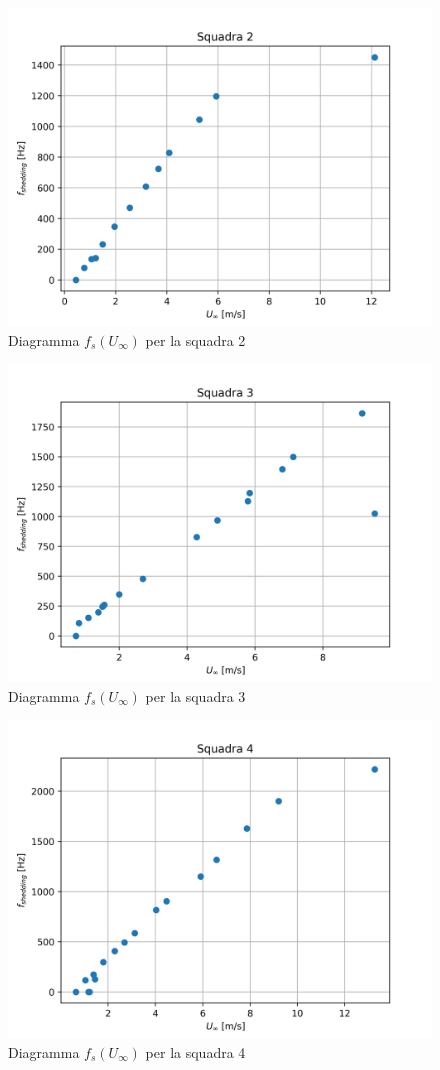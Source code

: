 \begin{figure}[H]
    \centering
    \includegraphics[width=.85\textwidth]{images/10/sq2.png}
    \caption{Diagramma $f_s(U_\infty)$ per la squadra 2}
\end{figure}
\begin{figure}[H]
    \centering
    \includegraphics[width=.85\textwidth]{images/10/sq3.png}
    \caption{Diagramma $f_s(U_\infty)$ per la squadra 3}
\end{figure}
\begin{figure}[H]
    \centering
    \includegraphics[width=.9\textwidth]{images/10/sq4.png}
    \caption{Diagramma $f_s(U_\infty)$ per la squadra 4}
\end{figure}

